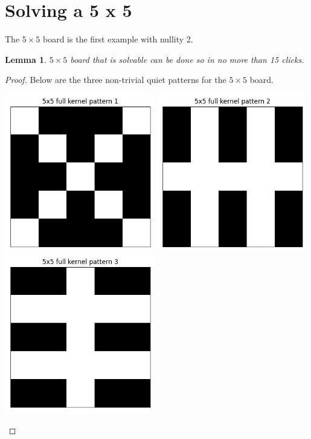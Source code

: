 \documentclass{article}
\newtheorem{lemma}{Lemma}
\begin{document}
	\section{Solving a 5 x 5}
	The $5 \times 5$ board is the first example with nullity 2.
	\begin{lemma}
		$5 \times 5$ board that is solvable can be done so in no more than 15 clicks.
	\end{lemma}
	\begin{proof}
		Below are the three non-trivial quiet patterns for the $5 \times 5$ board.
		\begin{center}
			\includegraphics[width=0.49\textwidth]{../../code/serialization/kernels/5x5/full/5x5_kernel_full_1.png}
			\includegraphics[width=0.49\textwidth]{../../code/serialization/kernels/5x5/full/5x5_kernel_full_2.png}
			\includegraphics[width=0.49\textwidth]{../../code/serialization/kernels/5x5/full/5x5_kernel_full_3.png}

\end{center}
\end{proof}
\end{document}
